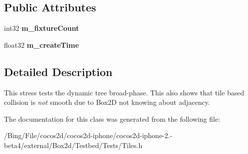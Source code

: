\subsection*{Public Attributes}
\begin{DoxyCompactItemize}
\item 
\hypertarget{class_tiles_a41f7d206714beb9786e7a7d51d1abc66}{int32 {\bfseries m\-\_\-fixture\-Count}}\label{class_tiles_a41f7d206714beb9786e7a7d51d1abc66}

\item 
\hypertarget{class_tiles_a7490aea9c64e764df70fe0cf5be8592f}{float32 {\bfseries m\-\_\-create\-Time}}\label{class_tiles_a7490aea9c64e764df70fe0cf5be8592f}

\end{DoxyCompactItemize}


\subsection{Detailed Description}
This stress tests the dynamic tree broad-\/phase. This also shows that tile based collision is {\itshape not\/} smooth due to Box2\-D not knowing about adjacency. 

The documentation for this class was generated from the following file\-:\begin{DoxyCompactItemize}
\item 
/\-Bing/\-File/cocos2d/cocos2d-\/iphone/cocos2d-\/iphone-\/2.-\/beta4/external/\-Box2d/\-Testbed/\-Tests/Tiles.\-h\end{DoxyCompactItemize}
